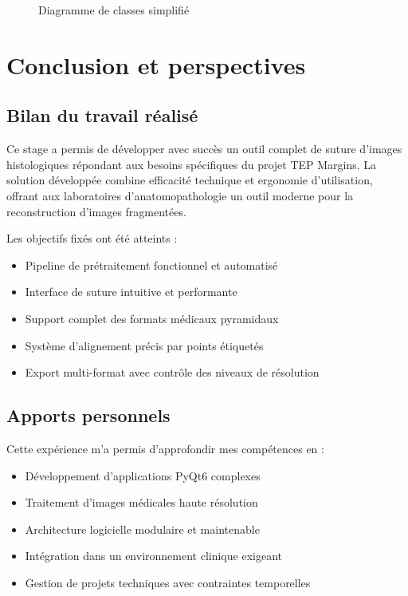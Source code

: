 \documentclass[11pt,a4paper]{report}
\begin{document}
\begin{figure}[htbp]
\caption{Diagramme de classes simplifié}
\end{figure}

\chapter{Conclusion et perspectives}

\section{Bilan du travail réalisé}

Ce stage a permis de développer avec succès un outil complet de suture d'images histologiques répondant aux besoins spécifiques du projet TEP Margins. La solution développée combine efficacité technique et ergonomie d'utilisation, offrant aux laboratoires d'anatomopathologie un outil moderne pour la reconstruction d'images fragmentées.

Les objectifs fixés ont été atteints :
\begin{itemize}
\item Pipeline de prétraitement fonctionnel et automatisé
\item Interface de suture intuitive et performante
\item Support complet des formats médicaux pyramidaux
\item Système d'alignement précis par points étiquetés
\item Export multi-format avec contrôle des niveaux de résolution
\end{itemize}

\section{Apports personnels}

Cette expérience m'a permis d'approfondir mes compétences en :

\begin{itemize}
\item Développement d'applications PyQt6 complexes
\item Traitement d'images médicales haute résolution
\item Architecture logicielle modulaire et maintenable
\item Intégration dans un environnement clinique exigeant
\item Gestion de projets techniques avec contraintes temporelles
\end{itemize}
\end{document}
